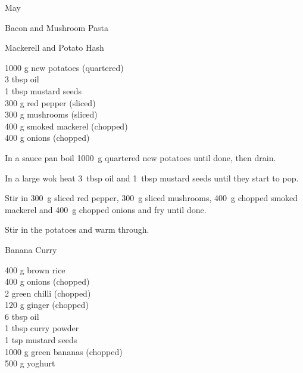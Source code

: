 \begin{menu}{May}
\begin{recipe}{1}{Bacon and Mushroom Pasta}
\begin{instructions}
    \end{instructions}
    \end{recipe}%
  
    \begin{recipe}{2}{Mackerell and Potato Hash}%
		\begin{ingredients}
		1000 g new potatoes (quartered) \\
	3 tbsp oil  \\
	1 tbsp mustard seeds  \\
	300 g red pepper (sliced) \\
	300 g mushrooms (sliced) \\
	400 g smoked mackerel (chopped) \\
	400 g onions (chopped) \\
	
		\end{ingredients}
	
	
    \begin{instructions}
    \item 
        In a sauce pan boil
        1000~g quartered new potatoes
        until done,
        then drain.
      \item 
        In a large wok heat
        3~tbsp  oil
        and
        1~tbsp  mustard seeds
        until they start to pop.
      \item 
        Stir in
        300~g sliced red pepper,
        300~g sliced mushrooms,
        400~g chopped smoked mackerel
        and
        400~g chopped onions
        and fry until done.
      \item 
        Stir in the potatoes
        and warm through.
      
    \end{instructions}
    \end{recipe}%
  
    \begin{recipe}{2}{Banana Curry}%
		\begin{ingredients}
		400 g brown rice  \\
	400 g onions (chopped) \\
	2  green chilli (chopped) \\
	120 g ginger (chopped) \\
	6 tbsp oil  \\
	1 tbsp curry powder  \\
	1 tsp mustard seeds  \\
	1000 g green bananas (chopped) \\
	500 g yoghurt  \\
	

\end{ingredients}
\end{recipe}
\end{menu}
